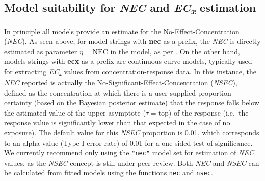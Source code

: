 \hypertarget{model-suitability-for-nec-and-ecx-estimation}{%
\subsection{\texorpdfstring{Model suitability for \emph{NEC} and
\emph{EC\textsubscript{x}}
estimation}{Model suitability for NEC and ECx estimation}}\label{model-suitability-for-nec-and-ecx-estimation}}

In principle all models provide an estimate for the
No-Effect-Concentration (\emph{NEC}). As seen above, for model strings
with \textbf{nec} as a prefix, the \emph{NEC} is directly estimated as
parameter \(\eta = \text{NEC}\) in the model, as per \citep{Fox2010}. On
the other hand, models strings with \textbf{ecx} as a prefix are
continuous curve models, typically used for extracting
\emph{EC\textsubscript{x}} values from concentration-response data. In
this instance, the \emph{NEC} reported is actually the
No-Significant-Effect-Concentration (\emph{NSEC}), defined as the
concentration at which there is a user supplied proportion certainty
(based on the Bayesian posterior estimate) that the response falls below
the estimated value of the upper asymptote (\(\tau = \text{top}\)) of
the response (i.e.~the response value is significantly lower than that
expected in the case of no exposure). The default value for this
\emph{NSEC} proportion is 0.01, which corresponds to an alpha value
(Type-I error rate) of 0.01 for a one-sided test of significance. We
currently recommend only using the \texttt{"nec"} model set for
estimation of \emph{NEC} values, as the \emph{NSEC} concept is still
under peer-review. Both \emph{NEC} and \emph{NSEC} can be calculated
from fitted models using the functions \texttt{nec} and \texttt{nsec}.

